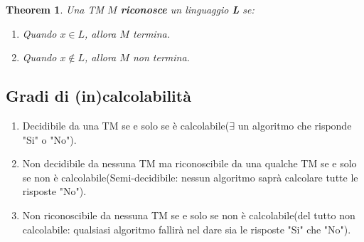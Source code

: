 \documentclass[a4paper, 12pt]{article}
\newtheorem{theorem}{Theorem}[section]
\begin{document}
\begin{theorem}
Una TM $M$ \textbf{riconosce} un linguaggio \textbf{L} se:
\begin{enumerate}
\item Quando $x \in L$, allora $M$ termina.
\item Quando $x \notin L$, allora $M$ non termina.
\end{enumerate}
\end{theorem}
\subsection{Gradi di (in)calcolabilit\`a}
\begin{enumerate}
\item Decidibile da una TM se e solo se \`e calcolabile($\exists$ un algoritmo che risponde "Si" o "No").
\item Non decidibile da nessuna TM ma riconoscibile da una qualche TM se e solo se non \`e calcolabile(Semi-decidibile: nessun algoritmo sapr\`a calcolare tutte le risposte "No").
\item Non riconoscibile da nessuna TM se e solo se non \`e calcolabile(del tutto non calcolabile: qualsiasi algoritmo fallir\`a nel dare sia le risposte "Si" che "No").
\end{enumerate}
\end{document}
